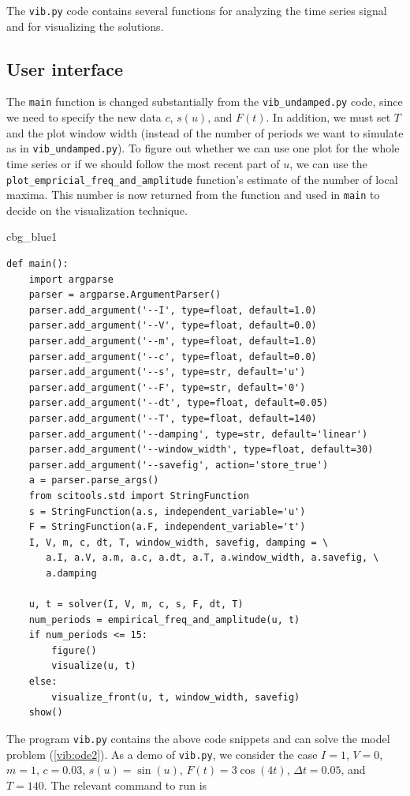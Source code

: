\documentclass[%
oneside,                 %
final,                   %
10pt]{article}
\newenvironment{_cod_tight}[1]{
   \def\FrameCommand{\colorbox{#1}}
   \FrameRule0.6pt\MakeFramed {\FrameRestore}\vskip3mm}
   {\vskip0mm\endMakeFramed}
\newenvironment{cod}[1]{
\bgroup\rmfamily
\fboxsep=0mm\relax
\begin{_cod_tight}{#1}
\list{}{\parsep=-2mm\parskip=0mm\topsep=0pt\leftmargin=2mm
\rightmargin=2\leftmargin\leftmargin=4pt\relax}
\item\relax}
{\endlist\end{_cod_tight}\egroup}
\begin{document}
The \texttt{vib.py} code
contains several functions for analyzing the time series signal
and for visualizing the solutions.

\subsection{User interface}
\label{vib:ode2:ui}


The \texttt{main} function is changed substantially from
the \Verb!vib_undamped.py! code, since we need to
specify the new data $c$, $s(u)$, and $F(t)$.  In addition, we must
set $T$ and the plot window width (instead of the number of periods we
want to simulate as in \Verb!vib_undamped.py!). To figure out whether we
can use one plot for the whole time series or if we should follow the
most recent part of $u$, we can use the \Verb!plot_empricial_freq_and_amplitude!
function's estimate of the number of local maxima. This number is now
returned from the function and used in \texttt{main} to decide on the
visualization technique.

\begin{cod}{cbg_blue1}\begin{Verbatim}[numbers=none,fontsize=\fontsize{9pt}{9pt},baselinestretch=0.95,xleftmargin=2mm]
def main():
    import argparse
    parser = argparse.ArgumentParser()
    parser.add_argument('--I', type=float, default=1.0)
    parser.add_argument('--V', type=float, default=0.0)
    parser.add_argument('--m', type=float, default=1.0)
    parser.add_argument('--c', type=float, default=0.0)
    parser.add_argument('--s', type=str, default='u')
    parser.add_argument('--F', type=str, default='0')
    parser.add_argument('--dt', type=float, default=0.05)
    parser.add_argument('--T', type=float, default=140)
    parser.add_argument('--damping', type=str, default='linear')
    parser.add_argument('--window_width', type=float, default=30)
    parser.add_argument('--savefig', action='store_true')
    a = parser.parse_args()
    from scitools.std import StringFunction
    s = StringFunction(a.s, independent_variable='u')
    F = StringFunction(a.F, independent_variable='t')
    I, V, m, c, dt, T, window_width, savefig, damping = \ 
       a.I, a.V, a.m, a.c, a.dt, a.T, a.window_width, a.savefig, \ 
       a.damping

    u, t = solver(I, V, m, c, s, F, dt, T)
    num_periods = empirical_freq_and_amplitude(u, t)
    if num_periods <= 15:
        figure()
        visualize(u, t)
    else:
        visualize_front(u, t, window_width, savefig)
    show()
\end{Verbatim}
\end{cod}
\noindent
The program \texttt{vib.py} contains
the above code snippets and can solve the model problem
(\ref{vib:ode2}). As a demo of \texttt{vib.py}, we consider the case
$I=1$, $V=0$, $m=1$, $c=0.03$, $s(u)=\sin(u)$, $F(t)=3\cos(4t)$,
$\Delta t = 0.05$, and $T=140$. The relevant command to run is
\end{document}
